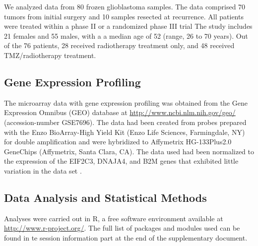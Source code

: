 \documentclass[9pt,twocolumn,twoside]{gsajnl}
\begin{document}
We analyzed data from 80 frozen glioblastoma samples. The data comprised 70 tumors from initial surgery and 10 samples resected at recurrence. All patients were treated within a phase II or a randomized phase III trial \citep{Stupp2002,Stupp2005}
The study includes 21 females and 55 males, with a a median age of 52 (range, 26 to 70 years). Out of the 76 patients, 28 received radiotherapy treatment only, and 48 received TMZ/radiotherapy treatment.

\subsection*{Gene Expression Profiling}

The microarray data with gene expression profiling was obtained from the Gene Expression Omnibus (GEO) database at \url{http://www.ncbi.nlm.nih.gov/geo/} (accession-number GSE7696). The data had been created from probes prepared with the Enzo BioArray-High Yield Kit (Enzo Life Sciences, Farmingdale, NY) for double amplification and were hybridized to Affymetrix HG-133Plus2.0 GeneChips (Affymetrix, Santa Clara, CA). The data used had been normalized to the expression of the EIF2C3, DNAJA4, and B2M genes that exhibited little variation in the data set \citep{Murat2008}.

\subsection*{Data Analysis and Statistical Methods}
Analyses were carried out in R, a free software environment available at \url{http://www.r-project.org/}. The full list of packages and modules used can be found in te session information part at the end of the supplementary document. 
\end{document}

